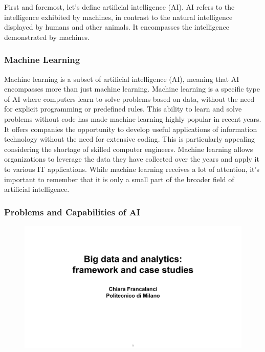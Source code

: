 First and foremost, let's define artificial intelligence (AI). AI refers
to the intelligence exhibited by machines, in contrast to the natural
intelligence displayed by humans and other animals. It encompasses the
intelligence demonstrated by machines.


\subsubsection{Machine Learning}\label{machine-learning}

Machine learning is a subset of artificial intelligence (AI), meaning
that AI encompasses more than just machine learning. Machine learning is
a specific type of AI where computers learn to solve problems based on
data, without the need for explicit programming or predefined rules.
This ability to learn and solve problems without code has made machine
learning highly popular in recent years. It offers companies the
opportunity to develop useful applications of information technology
without the need for extensive coding. This is particularly appealing
considering the shortage of skilled computer engineers. Machine learning
allows organizations to leverage the data they have collected over the
years and apply it to various IT applications. While machine learning
receives a lot of attention, it's important to remember that it is only
a small part of the broader field of artificial intelligence.


\subsubsection{Problems and Capabilities of
  AI}\label{problems-and-capabilities-of-ai}

\begin{figure}[!h]
  \centering
  \includegraphics[page=5, trim = 1.5cm 3cm 1.5cm 4cm, clip, width=\imagewidth]{images/06 - BIG_DATA.pdf}
\end{figure}

